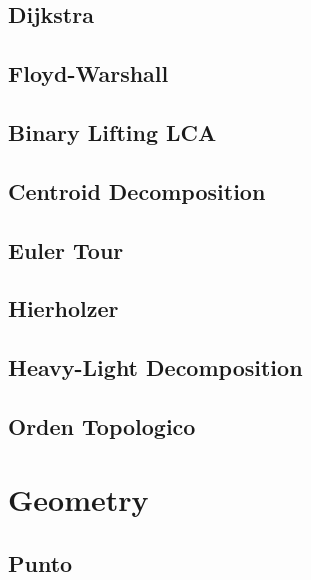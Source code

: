 \subsection{Dijkstra}
\raggedbottom
\hrulefill
\subsection{Floyd-Warshall}
\raggedbottom
\hrulefill
\subsection{Binary Lifting LCA}
\raggedbottom
\hrulefill
\subsection{Centroid Decomposition}
\raggedbottom
\hrulefill
\subsection{Euler Tour}
\raggedbottom
\hrulefill
\subsection{Hierholzer}
\raggedbottom
\hrulefill
\subsection{Heavy-Light Decomposition}
\raggedbottom
\hrulefill
\subsection{Orden Topologico}
\raggedbottom
\hrulefill
\newpage

\section{Geometry}
\subsection{Punto}
\raggedbottom
\hrulefill
